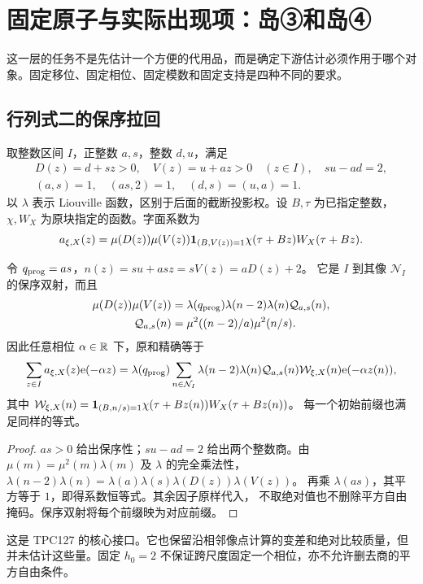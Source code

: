\section{固定原子与实际出现项：岛③和岛④}\label{sec:structure}
这一层的任务不是先估计一个方便的代用品，而是确定下游估计必须作用于哪个对象。固定移位、固定相位、固定模数和固定支持是四种不同的要求。

\subsection{行列式二的保序拉回}
取整数区间 $I$，正整数 $a,s$，整数 $d,u$，满足
\[
\begin{gathered}
D(z)=d+sz>0,\quad V(z)=u+az>0\quad(z\in I),\quad su-ad=2,\\
(a,s)=1,\quad(as,2)=1,\quad(d,s)=(u,a)=1.
\end{gathered}
\]
以 $\lambda$ 表示 Liouville 函数，区别于后面的截断投影权。设 $B,\tau$ 为已指定整数，$\chi,W_X$ 为原块指定的函数。字面系数为
\[
a_{\xi,X}(z)=\mu(D(z))\mu(V(z))\mathbf 1_{(B,V(z))=1}
\chi(\tau+Bz)W_X(\tau+Bz).
\]
\begin{proposition}[保留掩码的精确变换]\label{prop:pullback}
令 $q_{\rm prog}=as$，$n(z)=su+as z=sV(z)=aD(z)+2$。
它是 $I$ 到其像 $\mathcal N_I$ 的保序双射，而且
\begin{align*}
\mu(D(z))\mu(V(z))
&=\lambda(q_{\rm prog})\lambda(n-2)\lambda(n)\mathcal Q_{a,s}(n),\\
\mathcal Q_{a,s}(n)&=\mu^2((n-2)/a)\mu^2(n/s).
\end{align*}
因此任意相位 $\alpha\in\mathbb R$ 下，原和精确等于
\[
\sum_{z\in I}a_{\xi,X}(z)\mathrm e(-\alpha z)
=\lambda(q_{\rm prog})\sum_{n\in\mathcal N_I}
\lambda(n-2)\lambda(n)\mathcal Q_{a,s}(n)
\mathcal W_{\xi,X}(n)\mathrm e(-\alpha z(n)),
\]
其中 $\mathcal W_{\xi,X}(n)=\mathbf 1_{(B,n/s)=1}\chi(\tau+Bz(n))W_X(\tau+Bz(n))$。
每一个初始前缀也满足同样的等式。
\end{proposition}
\begin{proof}
$as>0$ 给出保序性；$su-ad=2$ 给出两个整数商。由
$\mu(m)=\mu^2(m)\lambda(m)$ 及 $\lambda$ 的完全乘法性，
$\lambda(n-2)\lambda(n)=\lambda(a)\lambda(s)\lambda(D(z))\lambda(V(z))$。
再乘 $\lambda(as)$，其平方等于 $1$，即得系数恒等式。其余因子原样代入，
不取绝对值也不删除平方自由掩码。保序双射将每个前缀映为对应前缀。
\end{proof}
这是 TPC127 的核心接口\cite{archive127}。它也保留沿相邻像点计算的变差和绝对比较质量，但并未估计这些量。固定 $h_0=2$ 不保证跨尺度固定一个相位，亦不允许删去商的平方自由条件。

